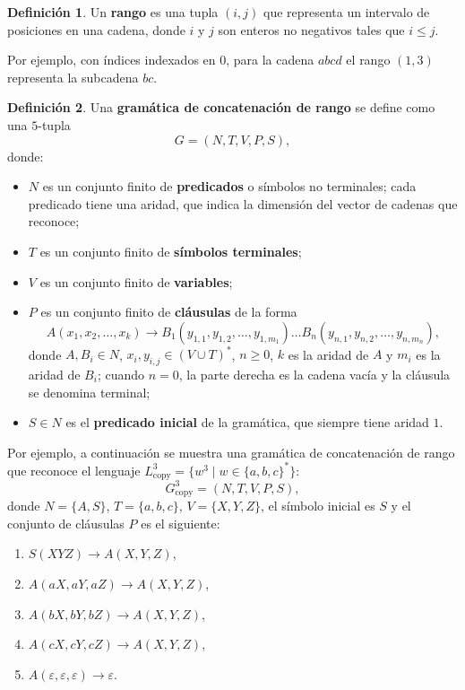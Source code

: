 \documentclass{report}
\theoremstyle{definition}
\newtheorem{definicion}{Definición}[chapter]
\theoremstyle{plain}
\theoremstyle{remark}
\begin{document}
\begin{definicion}
Un \textbf{rango} es una tupla $(i, j)$ que representa un intervalo de
posiciones en una cadena, donde $i$ y $j$ son enteros no negativos tales
que $i \le j$.
\end{definicion}

Por ejemplo, con índices indexados en $0$, para la cadena $abcd$ el
rango $(1, 3)$ representa la subcadena $bc$.

\begin{definicion}
\label{def:rcg}
Una \textbf{gramática de concatenación de rango} se define como una
$5$-tupla
\[
  G = (N, T, V, P, S),
\]
donde:
\begin{itemize}
  \item $N$ es un conjunto finito de \textbf{predicados} o símbolos no
    terminales; cada predicado tiene una aridad, que indica la dimensión
    del vector de cadenas que reconoce;
  \item $T$ es un conjunto finito de \textbf{símbolos terminales};
  \item $V$ es un conjunto finito de \textbf{variables};
  \item $P$ es un conjunto finito de \textbf{cláusulas} de la forma
    \[
      A(x_1, x_2, \dots, x_k) \to B_1(y_{1,1}, y_{1,2}, \dots, y_{1,m_1})
      \dots B_n(y_{n,1}, y_{n,2}, \dots, y_{n,m_n}),
    \]
    donde $A, B_i \in N$, $x_i, y_{i,j} \in (V \cup T)^*$, $n \ge 0$,
    $k$ es la aridad de $A$ y $m_i$ es la aridad de $B_i$; cuando
    $n = 0$, la parte derecha es la cadena vacía y la cláusula se
    denomina terminal;
  \item $S \in N$ es el \textbf{predicado inicial} de la gramática, que
    siempre tiene aridad $1$.
\end{itemize}
\end{definicion}

Por ejemplo, a continuación se muestra una gramática de concatenación
de rango que reconoce el lenguaje $L_{\mathrm{copy}}^3 = \{ w^3 \mid w
\in \{a, b, c\}^* \}$:
\[
  G_{\mathrm{copy}}^3 = (N, T, V, P, S),
\]
donde $N = \{A, S\}$, $T = \{a, b, c\}$, $V = \{X, Y, Z\}$, el símbolo
inicial es $S$ y el conjunto de cláusulas $P$ es el siguiente:
\begin{enumerate}
  \item $S(XYZ) \to A(X, Y, Z)$,
  \item $A(aX, aY, aZ) \to A(X, Y, Z)$,
  \item $A(bX, bY, bZ) \to A(X, Y, Z)$,
  \item $A(cX, cY, cZ) \to A(X, Y, Z)$,
  \item $A(\varepsilon, \varepsilon, \varepsilon) \to \varepsilon$.
\end{enumerate}
\end{document}

